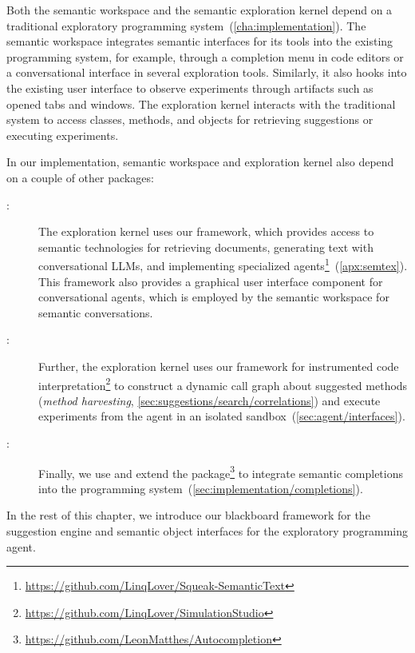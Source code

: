 Both the semantic workspace and the semantic exploration kernel depend on a traditional exploratory programming system~(\cref{cha:implementation}).
The semantic workspace integrates semantic interfaces for its tools into the existing programming system, for example, through a completion menu in code editors or a conversational interface in several exploration tools.
Similarly, it also hooks into the existing user interface to observe experiments through artifacts such as opened tabs and windows.
The exploration kernel interacts with the traditional system to access classes, methods, and objects for retrieving suggestions or executing experiments.

In our implementation, semantic workspace and exploration kernel also depend on a couple of other packages:

\begin{description}
	\item[\semtex:]
	The exploration kernel uses our \semtex framework, which provides access to semantic technologies for retrieving documents, generating text with conversational LLMs, and implementing specialized agents\footnote{\url{https://github.com/LinqLover/Squeak-SemanticText}}~(\cref{apx:semtex}).
	This framework also provides a graphical user interface component for conversational agents, which is employed by the semantic workspace for semantic conversations.

	\item[:]
	Further, the exploration kernel uses our  framework for instrumented code interpretation\footnote{\url{https://github.com/LinqLover/SimulationStudio}} to construct a dynamic call graph about suggested methods (\emph{method harvesting}, \cref{sec:suggestions/search/correlations}) and execute experiments from the agent in an isolated sandbox~(\cref{sec:agent/interfaces}).

	\item[:]
	Finally, we use and extend the  package\footnote{\url{https://github.com/LeonMatthes/Autocompletion}} to integrate semantic completions into the programming system~(\cref{sec:implementation/completions}).
\end{description}

In the rest of this chapter, we introduce our blackboard framework for the suggestion engine and semantic object interfaces for the exploratory programming agent.
